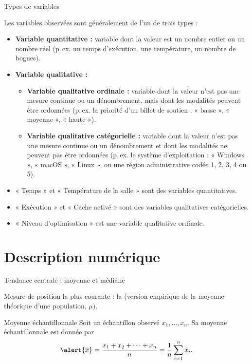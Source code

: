 \documentclass{BeamerTemplate}
\begin{document}
\begin{frame}[t]{Types de variables}
\vspace{-0.4cm}
{\footnotesize
Les variables observées sont généralement de l'un de trois types :
\begin{itemize}\itemsep0pt
\item<1-> \textbf{Variable quantitative :} variable dont la valeur est un nombre entier ou un nombre réel
(p.\,ex. un temps d'exécution, une température, un nombre de bogues).
\item<2-> \textbf{Variable qualitative :}
 \begin{itemize}\itemsep0pt
  \item<2-> \textbf{Variable qualitative ordinale :} variable dont la valeur n'est \alert{pas une mesure
  continue ou un dénombrement}, mais dont les modalités peuvent être \alert{ordonnées}
  (p.\,ex. la priorité d'un billet de soutien : « basse », « moyenne », « haute »).
  \item<3-> \textbf{Variable qualitative catégorielle :} variable dont la valeur n'est \alert{pas une mesure
  continue ou un dénombrement} et dont les modalités \alert{ne peuvent pas être ordonnées}
  (p.\,ex. le système d'exploitation : « Windows », « macOS », « Linux », ou une région administrative
  codée 1, 2, 3, 4 ou 5).
 \end{itemize}
\end{itemize}
\vspace{-2mm}
\begin{itemize}\itemsep0pt
\item « Temps » et « Température de la salle » sont des variables quantitatives.
\item « Exécution » et « Cache activé » sont des variables qualitatives catégorielles.
\item « Niveau d'optimisation » est une variable qualitative ordinale.
\end{itemize}
}

\end{frame}

\section{Description numérique}

\begin{frame}[t]{Tendance centrale : moyenne et médiane}

Mesure de position la plus courante : la  {\small (version empirique de la
moyenne théorique d'une population, $\mu$).}

\begin{Boite}{Moyenne échantillonnale}
Soit un échantillon observé $x_1,\ldots,x_n$. Sa moyenne échantillonnale est donnée par
$$\alert{\overline{x}}=\frac{x_1+x_2+\cdots+x_n}{n}=\frac{1}{n}\sum_{i=1}^nx_i.$$
\end{Boite}

\end{frame}
\end{document}
